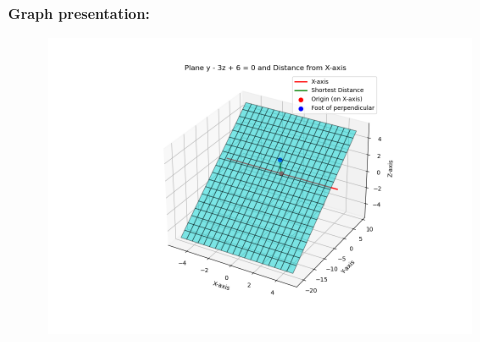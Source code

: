 \documentclass[journal]{IEEEtran}
\begin{document}
\textbf{Graph presentation:}
\begin{figure}[H]
\begin{center}
\includegraphics[width=0.6\columnwidth]{figs/fig8.png}
\end{center}
\caption{}
\label{fig:Fig}
\end{figure}
\end{document}
